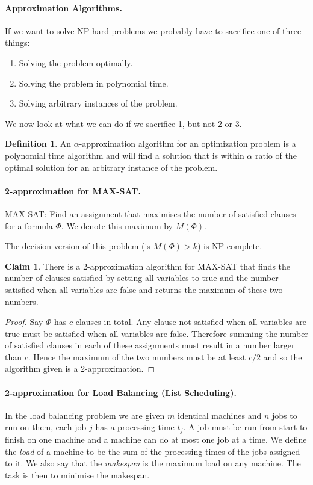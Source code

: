\documentclass[11pt,a4paper]{article}
\theoremstyle{definition}
\newtheorem{claim}{Claim}
\newtheorem{defn}{Definition}
\begin{document}
\paragraph{Approximation Algorithms.}
If we want to solve NP-hard problems we probably have to sacrifice one of three things:
\begin{enumerate}
\item Solving the problem optimally.
\item Solving the problem in polynomial time.
\item Solving arbitrary instances of the problem.
\end{enumerate}

We now look at what we can do if we sacrifice 1, but not 2 or 3.

\begin{defn}
An $\alpha$-approximation algorithm for an optimization problem is a polynomial time algorithm and will find a solution that is within $\alpha$ ratio of the optimal solution for an arbitrary instance of the problem.
\end{defn}

\paragraph{2-approximation for MAX-SAT.}
MAX-SAT: Find an assignment that maximises the number of satisfied clauses for a formula $\Phi$.
We denote this maximum by $M(\Phi)$.

The decision version of this problem (is $M(\Phi) > k$) is NP-complete.

\begin{claim}
There is a 2-approximation algorithm for MAX-SAT that finds the number of clauses satisfied by setting all variables to true and the number satisfied when all variables are false and returns the maximum of these two numbers.
\end{claim}
\begin{proof}
Say $\Phi$ has $c$ clauses in total.
Any clause not satisfied when all variables are true must be satisfied when all variables are false.
Therefore summing the number of satisfied clauses in each of these assignments must result in a number larger than $c$.
Hence the maximum of the two numbers must be at least $c/2$ and so the algorithm given is a 2-approximation.
\end{proof}

\paragraph{2-approximation for Load Balancing (List Scheduling).}
In the load balancing problem we are given $m$ identical machines and $n$ jobs to run on them, each job $j$ has a processing time $t_j$.
A job must be run from start to finish on one machine and a machine can do at most one job at a time.
We define the \emph{load} of a machine to be the sum of the processing times of the jobs assigned to it.
We also say that the \emph{makespan} is the maximum load on any machine.
The task is then to minimise the makespan.
\end{document}
